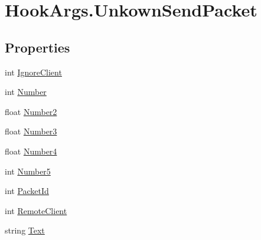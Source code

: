 \hypertarget{structOTA_1_1Plugin_1_1HookArgs_1_1UnkownSendPacket}{}\section{Hook\+Args.\+Unkown\+Send\+Packet}
\label{structOTA_1_1Plugin_1_1HookArgs_1_1UnkownSendPacket}
\subsection*{Properties}
\begin{DoxyCompactItemize}
\item 
int \hyperlink{structOTA_1_1Plugin_1_1HookArgs_1_1UnkownSendPacket_a18fff2568c9b3de0be4cfecd3e4463aa}{Ignore\+Client}
\item 
int \hyperlink{structOTA_1_1Plugin_1_1HookArgs_1_1UnkownSendPacket_acf5ae4f5ecc8e72593cf0f832377b945}{Number}
\item 
float \hyperlink{structOTA_1_1Plugin_1_1HookArgs_1_1UnkownSendPacket_a99d8e2d0a8e452cbb600cf97b083bb83}{Number2}
\item 
float \hyperlink{structOTA_1_1Plugin_1_1HookArgs_1_1UnkownSendPacket_ac43109cdc27c1988f42dcb0bd9c3e3c2}{Number3}
\item 
float \hyperlink{structOTA_1_1Plugin_1_1HookArgs_1_1UnkownSendPacket_a24a2631ffdf0a37ee1a908dee2ea44de}{Number4}
\item 
int \hyperlink{structOTA_1_1Plugin_1_1HookArgs_1_1UnkownSendPacket_a916f45fca66dc84a59310d2bc8177651}{Number5}
\item 
int \hyperlink{structOTA_1_1Plugin_1_1HookArgs_1_1UnkownSendPacket_aa4c7389a3e127612105fb64dc780887c}{Packet\+Id}
\item 
int \hyperlink{structOTA_1_1Plugin_1_1HookArgs_1_1UnkownSendPacket_a40759627b2a827508158b451d3b720e1}{Remote\+Client}
\item 
string \hyperlink{structOTA_1_1Plugin_1_1HookArgs_1_1UnkownSendPacket_ab4726c7c06ae41233e679361293b4173}{Text}
\end{DoxyCompactItemize}


